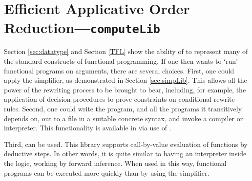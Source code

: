 
\section{Efficient Applicative Order Reduction---\texttt{computeLib}}
\label{sec:computeLib}

Section \ref{sec:datatype} and Section \ref{TFL} show the ability of
\HOL{} to represent many of the standard constructs of functional
programming. If one then wants to `run' functional programs on
arguments, there are several choices. First, one could apply the
simplifier, as demonstrated in Section \ref{sec:simpLib}. This allows
all the power of the rewriting process to be brought to bear,
including, for example, the application of decision procedures to
prove constraints on conditional rewrite rules.  Second, one could
write the program, and all the programs it transitively depends on,
out to a file in a suitable concrete syntax, and invoke a compiler or
interpreter. This functionality is available in \HOL{} via use of
.

Third,  can be used. This library supports call-by-value
evaluation of \HOL{} functions by deductive steps. In other words, it
is quite similar to having an \ML{} interpreter inside the \HOL{} logic,
working by forward inference. When used in this way, functional
programs can be executed more quickly than by using the simplifier.

